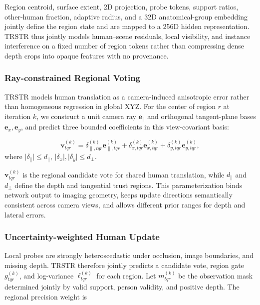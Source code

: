 \documentclass{article}
\begin{document}
Region centroid, surface extent, 2D projection, probe tokens, support ratios, other-human fraction, adaptive radius, and a 32D anatomical-group embedding jointly define the region state and are mapped to a 256D hidden representation. TRSTR thus jointly models human--scene residuals, local visibility, and instance interference on a fixed number of region tokens rather than compressing dense depth crops into opaque features with no provenance.

\subsubsection{Ray-constrained Regional Voting}

TRSTR models human translation as a camera-induced anisotropic error rather than homogeneous regression in global XYZ. For the center of region $r$ at iteration $k$, we construct a unit camera ray $\mathbf{e}_{\parallel}$ and orthogonal tangent-plane bases $\mathbf{e}_{x},\mathbf{e}_{y}$, and predict three bounded coefficients in this view-covariant basis:

\begin{equation}
\mathbf{v}_{tqr}^{(k)}
=\delta_{\parallel,tqr}^{(k)}\mathbf{e}_{\parallel,tqr}^{(k)}
+\delta_{x,tqr}^{(k)}\mathbf{e}_{x,tqr}^{(k)}
+\delta_{y,tqr}^{(k)}\mathbf{e}_{y,tqr}^{(k)},
\label{eq:regional-vote}
\end{equation}
\noindent where
$\lvert\delta_{\parallel}\rvert\le d_{\parallel}$,
$\lvert\delta_x\rvert,\lvert\delta_y\rvert\le d_{\perp}$.

$\mathbf{v}_{tqr}^{(k)}$ is the regional candidate vote for shared human translation, while $d_{\parallel}$ and $d_{\perp}$ define the depth and tangential trust regions. This parameterization binds network output to imaging geometry, keeps update directions semantically consistent across camera views, and allows different prior ranges for depth and lateral errors.

\subsubsection{Uncertainty-weighted Human Update}

Local probes are strongly heteroscedastic under occlusion, image boundaries, and missing depth. TRSTR therefore jointly predicts a candidate vote, region gate $g_{tqr}^{(k)}$, and log-variance $\ell_{tqr}^{(k)}$ for each region. Let $m_{tqr}^{(k)}$ be the observation mask determined jointly by valid support, person validity, and positive depth. The regional precision weight is
\end{document}

